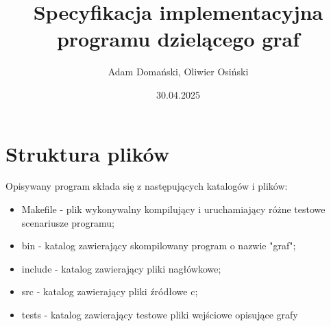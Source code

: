 \documentclass{article}
\title{\textbf{Specyfikacja implementacyjna programu dzielącego graf}}
\author{Adam Domański, Oliwier Osiński}
\date{30.04.2025}
\begin{document}
\maketitle

\section*{Struktura plików}
Opisywany program składa się z następujących katalogów i plików:
\begin{itemize}
    \item Makefile - plik wykonywalny kompilujący i uruchamiający różne testowe scenariusze programu;
    \item bin - katalog zawierający skompilowany program o nazwie "graf";
    \item include - katalog zawierający pliki nagłówkowe;
    \item src - katalog zawierający pliki źródłowe c;
    \item tests - katalog zawierający testowe pliki wejściowe opisujące grafy
\end{itemize}
\end{document}
